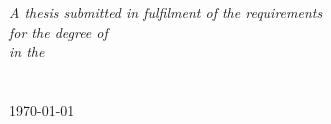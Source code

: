\documentclass[
12pt, %
english, %
onehalfspacing, %
nolistspacing, %
liststotoc, %
toctotoc, %
parskip, %
headsepline, %
]{MastersDoctoralThesis} %
\begin{document}
\begin{titlepage}
\begin{center}
\large \textit{A thesis submitted in fulfilment of the requirements\\ for the degree of \degreename}\\[0.2cm] %
\textit{in the}\\[0.2cm]
\groupname\\\deptname\\[0.5cm] %
 {\large \printdayoff\today}\\[2cm] %
 
\vfill
\end{center}
\end{titlepage}

 


\mainmatter %

\pagestyle{thesis} %


 
 
 
 \setcounter{chapter}{7}


%
% 
%
% 
% 
% 



%
%


\renewcommand{\harvardurl}{\textbf{URL:} \url}

\end{document}
